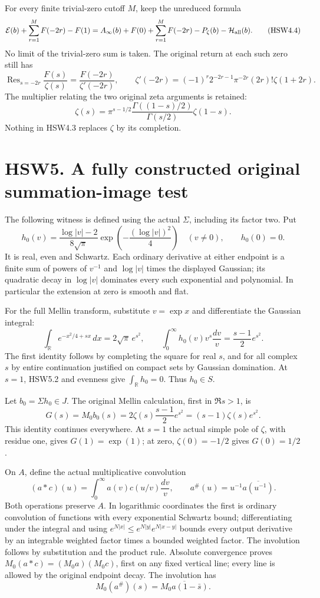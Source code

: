 For every finite trivial-zero cutoff \(M\), keep the unreduced formula
\[
\mathcal E(b)+\sum_{r=1}^M F(-2r)-F(1)
=A_\infty(b)+F(0)+\sum_{r=1}^M F(-2r)
-P_\zeta(b)-\mathcal H_{\rm all}(b).
\tag{HSW4.4}
\] No limit of the trivial-zero sum is taken. The original return at
each such zero still has \[
\operatorname{Res}_{s=-2r}\frac{F(s)}{\zeta(s)}
=\frac{F(-2r)}{\zeta'(-2r)},\qquad
\zeta'(-2r)=(-1)^r2^{-2r-1}\pi^{-2r}(2r)!\zeta(1+2r).
\tag{HSW4.5}
\] The multiplier relating the two original zeta arguments is retained:
\[
\zeta(s)=
\pi^{s-1/2}\frac{\Gamma((1-s)/2)}{\Gamma(s/2)}\zeta(1-s).
\tag{HSW4.6}
\] Nothing in HSW4.3 replaces \(\zeta\) by its completion.

\section{HSW5. A fully constructed original summation-image
test}\label{hsw5.-a-fully-constructed-original-summation-image-test}

The following witness is defined using the actual \(\Sigma\), including
its factor two. Put \[
h_0(v)=
\frac{\log|v|-2}{8\sqrt\pi}
\exp\!\left(-\frac{(\log|v|)^2}{4}\right)\quad(v\ne0),
\qquad h_0(0)=0.
\tag{HSW5.1}
\] It is real, even and Schwartz. Each ordinary derivative at either
endpoint is a finite sum of powers of \(v^{-1}\) and \(\log|v|\) times
the displayed Gaussian; its quadratic decay in \(\log|v|\) dominates
every such exponential and polynomial. In particular the extension at
zero is smooth and flat.

For the full Mellin transform, substitute \(v=\exp x\) and differentiate
the Gaussian integral: \[
\int_{\mathbb R}e^{-x^2/4+sx}\,dx=2\sqrt\pi\,e^{s^2},\qquad
\int_0^\infty h_0(v)v^s\frac{dv}{v}
=\frac{s-1}{2}e^{s^2}.
\tag{HSW5.2}
\] The first identity follows by completing the square for real \(s\),
and for all complex \(s\) by entire continuation justified on compact
sets by Gaussian domination. At \(s=1\), HSW5.2 and evenness give
\(\int_{\mathbb{R}} h_0=0\). Thus \(h_0\in S\).

Let \(b_0=\Sigma h_0\in J\). The original Mellin calculation, first in
\(\Re s>1\), is \[
G(s)=M_0b_0(s)
=2\zeta(s)\frac{s-1}{2}e^{s^2}
=(s-1)\zeta(s)e^{s^2}.
\tag{HSW5.3}
\] This identity continues everywhere. At \(s=1\) the actual simple pole
of \(\zeta\), with residue one, gives \(G(1)=\exp(1)\); at zero,
\(\zeta(0)=-1/2\) gives \(G(0)=1/2\).

On \(A\), define the actual multiplicative convolution \[
(a*c)(u)=\int_0^\infty a(v)c(u/v)\frac{dv}{v},\qquad
a^\#(u)=u^{-1}\overline{a(u^{-1})}.
\] Both operations preserve \(A\). In logarithmic coordinates the first
is ordinary convolution of functions with every exponential Schwartz
bound; differentiating under the integral and using
\(e^{N|x|}\le e^{N|y|}e^{N|x-y|}\) bounds every output derivative by an
integrable weighted factor times a bounded weighted factor. The
involution follows by substitution and the product rule. Absolute
convergence proves \(M_0(a*c)=(M_0a)(M_0c)\), first on any fixed
vertical line; every line is allowed by the original endpoint decay. The
involution has \[
M_0(a^\#)(s)=\overline{M_0a(1-\bar s)}.
\tag{HSW5.4}
\]

